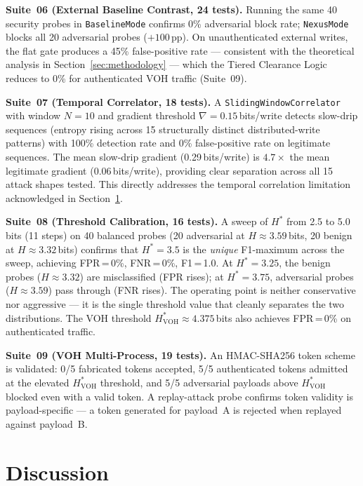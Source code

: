 \documentclass[11pt,twocolumn]{article}
\begin{document}
\textbf{Suite~06 (External Baseline Contrast, 24 tests).}
Running the same 40 security probes in \texttt{BaselineMode} confirms
0\% adversarial block rate; \texttt{NexusMode} blocks all 20 adversarial
probes ($+100$\,pp). On unauthenticated external writes, the flat gate
produces a 45\% false-positive rate --- consistent with the theoretical
analysis in Section~\ref{sec:methodology} --- which the Tiered
Clearance Logic reduces to 0\% for authenticated VOH traffic
(Suite~09).

\textbf{Suite~07 (Temporal Correlator, 18 tests).}
A \texttt{SlidingWindowCorrelator} with window $N=10$ and gradient
threshold $\nabla=0.15$\,bits/write detects slow-drip sequences
(entropy rising across 15 structurally distinct distributed-write
patterns) with 100\% detection rate and 0\% false-positive rate on
legitimate sequences. The mean slow-drip gradient
(0.29\,bits/write) is $4.7{\times}$ the mean legitimate gradient
(0.06\,bits/write), providing clear separation across all 15 attack
shapes tested.
This directly addresses the temporal correlation limitation
acknowledged in Section~\ref{sec:discussion}.

\textbf{Suite~08 (Threshold Calibration, 16 tests).}
A sweep of $H^{*}$ from 2.5 to 5.0\,bits (11 steps) on 40 balanced
probes (20 adversarial at $H\approx3.59$\,bits, 20 benign at
$H\approx3.32$\,bits) confirms that $H^{*}=3.5$ is the
\emph{unique} F1-maximum across the sweep, achieving
FPR\,=\,0\%, FNR\,=\,0\%, F1\,=\,1.0. At $H^{*}=3.25$, the benign
probes ($H\approx3.32$) are misclassified (FPR rises); at $H^{*}=3.75$,
adversarial probes ($H\approx3.59$) pass through (FNR rises).
The operating point is neither conservative nor aggressive --- it is
the single threshold value that cleanly separates the two distributions.
The VOH threshold $H^{*}_\text{VOH}\approx4.375$\,bits also achieves
FPR\,=\,0\% on authenticated traffic.

\textbf{Suite~09 (VOH Multi-Process, 19 tests).}
An HMAC-SHA256 token scheme is validated: 0/5 fabricated tokens
accepted, 5/5 authenticated tokens admitted at the elevated
$H^{*}_\text{VOH}$ threshold, and 5/5 adversarial payloads above
$H^{*}_\text{VOH}$ blocked even with a valid token. A replay-attack
probe confirms token validity is payload-specific --- a token
generated for payload~A is rejected when replayed against payload~B.

\section{Discussion}
\label{sec:discussion}
\end{document}
